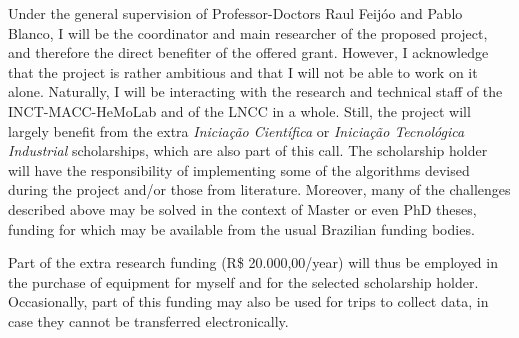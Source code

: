 Under the general supervision of Professor-Doctors Raul Feij\'oo and Pablo Blanco, I will be the coordinator and main researcher of the proposed project, and therefore the direct benefiter of the offered grant. However, I acknowledge that the project is rather ambitious and that I will not be able to work on it alone. Naturally, I will be interacting with the research and technical staff of the INCT-MACC-HeMoLab and of the LNCC in a whole. Still, the project will largely benefit from the extra {\em Inicia\c{c}\~ao Cient\'ifica} or {\em Inicia\c{c}\~ao Tecnol\'ogica Industrial} scholarships, which are also part of this call. The scholarship holder will have the responsibility of implementing some of the algorithms devised during the project and/or those from literature. Moreover, many of the challenges described above may be solved in the context of Master or even PhD theses, funding for which may be available from the usual Brazilian funding bodies.

Part of the extra research funding (R\$ 20.000,00/year) will thus be employed in the purchase of equipment for myself and for the selected scholarship holder. Occasionally, part of this funding may also be used for trips to collect data, in case they cannot be transferred electronically.
